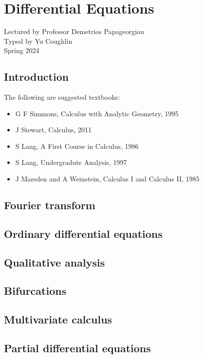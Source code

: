 \documentclass[../Year1.tex]{subfiles}
\begin{document}
\chapter{Differential Equations}
\renewcommand*\thesection{\arabic{section}}
Lectured by Professor Demetrios Papageorgiou \\ Typed by Yu Coughlin \\
Spring 2024

\section*{Introduction}


The following are suggested textbooks:
\begin{itemize}
    \item G F Simmons, Calculus with Analytic Geometry, 1995
    \item J Stewart, Calculus, 2011
    \item S Lang, A First Course in Calculus, 1986
    \item S Lang, Undergradute Analysis, 1997
    \item J Marsden and A Weinstein, Calculus I and Calculus II, 1985
\end{itemize}

\tableofcontents\pagebreak

\section{Fourier transform}
\section{Ordinary differential equations}
\section{Qualitative analysis}
\section{Bifurcations}
\section{Multivariate calculus}
\section{Partial differential equations}
\end{document}

